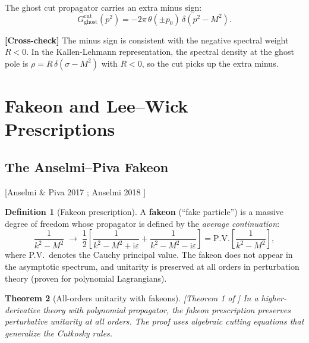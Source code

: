 \documentclass[11pt,a4paper]{article}
\theoremstyle{plain}
\newtheorem{theorem}{Theorem}[section]
\theoremstyle{definition}
\newtheorem{definition}[theorem]{Definition}
\theoremstyle{remark}
\newcommand{\ii}{\mathrm{i}}
\newcommand{\fromlit}[1]{\textcolor{blue!70!black}{\textsf{[#1]}}}
\newcommand{\crosscheck}[1]{%
  \par\smallskip\noindent
  \colorbox{blue!10}{\parbox{\dimexpr\linewidth-2\fboxsep}{%
    \textcolor{blue!50!black}{\textbf{[Cross-check]}} #1}}%
  \par\smallskip}
\begin{document}
The ghost cut propagator carries an extra minus sign:
\begin{equation}\label{eq:ghost-cut}
  G^{\mathrm{cut}}_{\mathrm{ghost}}(p^2)
  = -2\pi\,\theta(\pm p_0)\,\delta(p^2 - M^2).
\end{equation}

\crosscheck{The minus sign is consistent with the negative spectral
weight $R < 0$.  In the Kallen-Lehmann representation, the spectral
density at the ghost pole is $\rho = R\,\delta(\sigma - M^2)$ with
$R < 0$, so the cut picks up the extra minus.}


\section{Fakeon and Lee--Wick Prescriptions}
\label{sec:fakeon}

\subsection{The Anselmi--Piva Fakeon}

\fromlit{Anselmi \& Piva 2017 \cite{AnselmiPiva2017};
Anselmi 2018 \cite{Anselmi2018}}

\begin{definition}[Fakeon prescription]
\label{def:fakeon}
A \textbf{fakeon} (``fake particle'') is a massive degree of freedom
whose propagator is defined by the \emph{average continuation}:
\begin{equation}\label{eq:fakeon}
  \frac{1}{k^2 - M^2}
  \;\to\;
  \frac{1}{2}\!\left[
    \frac{1}{k^2 - M^2 + \ii\varepsilon}
    + \frac{1}{k^2 - M^2 - \ii\varepsilon}
  \right]
  = \mathrm{P.V.}\!\left[\frac{1}{k^2 - M^2}\right],
\end{equation}
where P.V.\ denotes the Cauchy principal value.  The fakeon does not
appear in the asymptotic spectrum, and unitarity is preserved at all
orders in perturbation theory (proven for polynomial Lagrangians).
\end{definition}

\begin{theorem}[All-orders unitarity with fakeons]
\label{thm:anselmi}
\fromlit{Theorem 1 of \cite{Anselmi2018}}
In a higher-derivative theory with polynomial propagator, the fakeon
prescription preserves perturbative unitarity at all orders.  The proof
uses algebraic cutting equations that generalize the Cutkosky rules.
\end{theorem}
\end{document}
